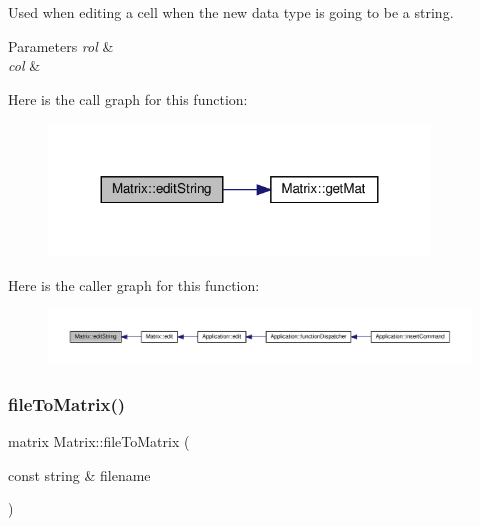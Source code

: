 Used when editing a cell when the new data type is going to be a string. 
\begin{DoxyParams}{Parameters}
{\em rol} & \\
\hline
{\em col} & \\
\hline
\end{DoxyParams}
Here is the call graph for this function\+:\nopagebreak
\begin{figure}[H]
\begin{center}
\leavevmode
\includegraphics[width=287pt]{class_matrix_a7029d8a3cd3c691b46adfd777abc880c_cgraph}
\end{center}
\end{figure}
Here is the caller graph for this function\+:\nopagebreak
\begin{figure}[H]
\begin{center}
\leavevmode
\includegraphics[width=350pt]{class_matrix_a7029d8a3cd3c691b46adfd777abc880c_icgraph}
\end{center}
\end{figure}
\mbox{\label{class_matrix_a35eb9dcb01c552fea1f5926db35339ef}} 
\subsubsection{\texorpdfstring{file\+To\+Matrix()}{fileToMatrix()}}
{\footnotesize\ttfamily matrix Matrix\+::file\+To\+Matrix (\begin{DoxyParamCaption}\item[{const string \&}]{filename }\end{DoxyParamCaption})}


